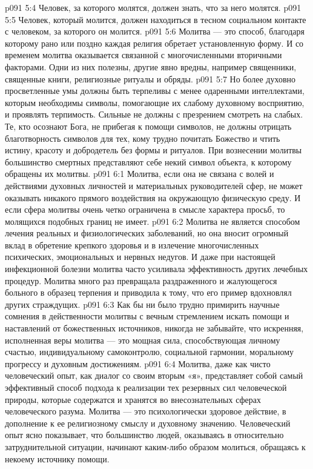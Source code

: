 \vs p091 5:4 \bibnobreakspace Человек, за которого молятся, должен знать, что за него молятся.
\vs p091 5:5 \bibnobreakspace Человек, который молится, должен находиться в тесном социальном контакте с человеком, за которого он молится.
\vs p091 5:6 \pc Молитва --- это способ, благодаря которому рано или поздно каждая религия обретает установленную форму. И со временем молитва оказывается связанной с многочисленными вторичными факторами. Одни из них полезны, другие явно вредны, например священники, священные книги, религиозные ритуалы и обряды.
\vs p091 5:7 Но более духовно просветленные умы должны быть терпеливы с менее одаренными интеллектами, которым необходимы символы, помогающие их слабому духовному восприятию, и проявлять терпимость. Сильные не должны с презрением смотреть на слабых. Те, кто осознают Бога, не прибегая к помощи символов, не должны отрицать благотворность символов для тех, кому трудно почитать Божество и чтить истину, красоту и добродетель без формы и ритуалов. При вознесении молитвы большинство смертных представляют себе некий символ объекта, к которому обращены их молитвы.
\vs p091 6:1 Молитва, если она не связана с волей и действиями духовных личностей и материальных руководителей сфер, не может оказывать никакого прямого воздействия на окружающую физическую среду. И если сфера молитвы очень четко ограничена в смысле характера просьб, то  молящихся подобных границ не имеет.
\vs p091 6:2 Молитва не является способом лечения реальных и физиологических заболеваний, но она вносит огромный вклад в обретение крепкого здоровья и в излечение многочисленных психических, эмоциональных и нервных недугов. И даже при настоящей инфекционной болезни молитва часто усиливала эффективность других лечебных процедур. Молитва много раз превращала раздраженного и жалующегося больного в образец терпения и приводила к тому, что его пример вдохновлял других страждущих.
\vs p091 6:3 Как бы ни было трудно примирить научные сомнения в действенности молитвы с вечным стремлением искать помощи и наставлений от божественных источников, никогда не забывайте, что искренняя, исполненная веры молитва --- это мощная сила, способствующая личному счастью, индивидуальному самоконтролю, социальной гармонии, моральному прогрессу и духовным достижениям.
\vs p091 6:4 Молитва, даже как чисто человеческий опыт, как диалог со своим вторым «я», представляет собой самый эффективный способ подхода к реализации тех резервных сил человеческой природы, которые содержатся и хранятся во внесознательных сферах человеческого разума. Молитва --- это психологически здоровое действие, в дополнение к ее религиозному смыслу и духовному значению. Человеческий опыт ясно показывает, что большинство людей, оказываясь в относительно затруднительной ситуации, начинают каким\hyp{}либо образом молиться, обращаясь к некоему источнику помощи.
